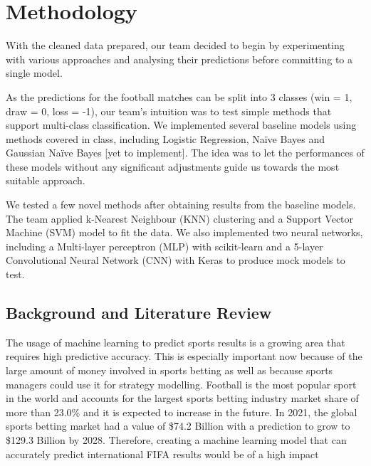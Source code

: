 \documentclass[8pt]{article}
\begin{document}
\section{Methodology}
With the cleaned data prepared, our team decided to begin by experimenting with various approaches and analysing their predictions before committing to a single model.

As the predictions for the football matches can be split into 3 classes (win = 1, draw = 0, loss = -1), our team's intuition was to test simple methods that support multi-class classification. We implemented several baseline models using methods covered in class, including Logistic Regression, Naïve Bayes and Gaussian Naïve Bayes [yet to implement]. The idea was to let the performances of these models without any significant adjustments guide us towards the most suitable approach.

We tested a few novel methods after obtaining results from the baseline models. The team applied k-Nearest Neighbour (KNN) clustering and a Support Vector Machine (SVM) model to fit the data. We also implemented two neural networks, including a  Multi-layer perceptron (MLP) with scikit-learn and a 5-layer Convolutional Neural Network (CNN) with Keras to produce mock models to test.
\label{sec:others}

\subsection{Background and Literature Review}

The usage of machine learning to predict sports results is a growing area that requires high predictive accuracy. This is especially important now because of the large amount of money involved in sports betting as well as because sports managers could use it for strategy modelling. Football is the most popular sport in the world and accounts for the largest sports betting industry market share of more than 23.0\% and it is expected to increase in the future. \cite{footballstats} 
In 2021, the global sports betting market had a value of \$74.2 Billion with a prediction to grow to \$129.3 Billion by 2028. \cite{footballstats2} 
Therefore, creating a machine learning model that can accurately predict international FIFA results would be of a high impact
 
\end{document}

